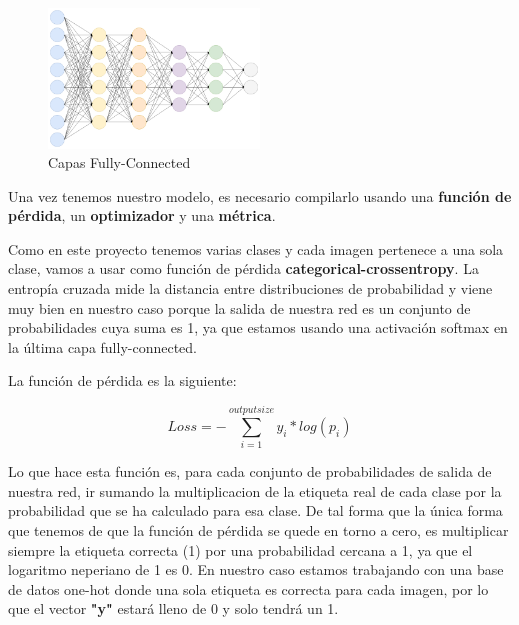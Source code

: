 \vspace{5 mm}

\begin{figure}[H]
\centering
  \includegraphics[width=0.5\textwidth]{Imagenes/fully.png}
   \caption{Capas Fully-Connected}
\end{figure}

\vspace{5 mm}

Una vez tenemos nuestro modelo, es necesario compilarlo usando una \textbf{función de pérdida}, un \textbf{optimizador} y una \textbf{métrica}.

\vspace{2 mm}

Como en este proyecto tenemos varias clases y cada imagen pertenece a una sola clase, vamos a usar como función de pérdida \textbf{categorical-crossentropy}. La entropía cruzada mide la distancia entre distribuciones de probabilidad y viene muy bien en nuestro caso porque la salida de nuestra red es un conjunto de probabilidades cuya suma es 1, ya que estamos usando una activación softmax en la última capa fully-connected.

\vspace{2 mm}

La función de pérdida es la siguiente:

\[Loss = - \sum_{i=1}^{output size}y_i * log (p_i) \]

Lo que hace esta función es, para cada conjunto de probabilidades de salida de nuestra red, ir sumando la multiplicacion de la etiqueta real de cada clase por la probabilidad que se ha calculado para esa clase. De tal forma que la única forma que tenemos de que la función de pérdida se quede en torno a cero, es multiplicar siempre la etiqueta correcta (1) por una probabilidad cercana a 1, ya que el logaritmo neperiano de 1 es 0. En nuestro caso estamos trabajando con una base de datos one-hot donde una sola etiqueta es correcta para cada imagen, por lo que el vector \textbf{"y"} estará lleno de 0 y solo tendrá un 1.

\vspace{2 mm}

